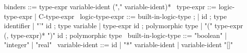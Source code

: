 \begin{syntax}
  binders ::= type-expr variable-ident ("," variable-ident)*
  \
  type-expr ::= logic-type-expr | C-type-expr
  \
  logic-type-expr ::= built-in-logic-type ;
  | id ; type identifier
  | "'" id ; type variable
  | type-expr id ; polymorphic type                 
  | "(" type-expr (, type-expr)* ")" id ; polymorphic type
  \
  built-in-logic-type ::= "boolean" | "integer" | "real" 
  \
  variable-ident ::= id 
  | "*" variable-ident 
  | variable-ident "[]"
\end{syntax}